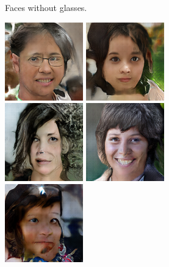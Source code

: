 \begin{figure}[!h]
\begin{subfigure}[b]{\textwidth}
{        }
        \caption{Faces without glasses.}
        \vspace{0.1cm}
    \end{subfigure}
    \begin{subfigure}[b]{\textwidth}
        \centerline{
            \includegraphics[scale=0.485]{figures/ffhq/labeled-hair-black/ffhq128x128_image003.png}
            \includegraphics[scale=0.485]{figures/ffhq/labeled-hair-black/ffhq128x128_image005.png}
            \includegraphics[scale=0.485]{figures/ffhq/labeled-hair-black/ffhq128x128_image007.png}
            \includegraphics[scale=0.485]{figures/ffhq/labeled-hair-black/ffhq128x128_image010.png}
            \includegraphics[scale=0.485]{figures/ffhq/labeled-hair-black/ffhq128x128_image011.png}
}
\end{subfigure}
\end{figure}
